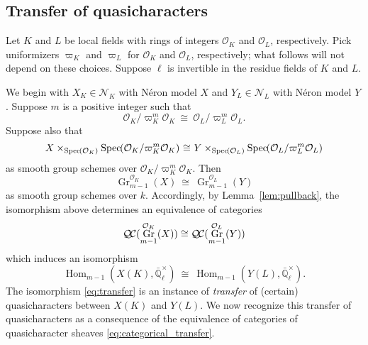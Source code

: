 \documentclass[10pt]{amsart}
\theoremstyle{plain}
\theoremstyle{definition}
\theoremstyle{remark}
\newcommand{\EE}{\mathbb{\bar Q}_\ell}
\newcommand{\OK}{\mathcal{O}_K}
\newcommand{\OL}{\mathcal{O}_L}
\newcommand{\Fq}{k}
\newcommand{\EEx}{\EE^\times}
\DeclareMathOperator{\Hom}{Hom}
\DeclareMathOperator{\Gr}{Gr}
\newcommand{\Spec}[1]{{\operatorname{Spec}\hskip-1pt( #1 )}}
\newcommand{\iso}{{\ \cong\ }}
\newcommand{\QC}{{\mathcal{Q\hskip-0.8pt C}}}
\begin{document}
\subsection{Transfer of quasicharacters}\label{ssec:transfer}

Let $K$ and $L$ be local fields with rings of integers $\OK$ and $\OL$, respectively. 
Pick uniformizers $\varpi_K$ and $\varpi_L$ for $\OK$ and $\OL$, respectively;
what follows will not depend on these choices.
Suppose $\ell$ is invertible in the residue fields of $K$ and $L$.

We begin with $X_K\in \mathcal{N}_K$ with N\'eron model $X$ and $Y_{L}\in \mathcal{N}_L$ with N\'eron model $Y$.
Suppose $m$ is a positive integer such that 
\[
\OK/\varpi_K^{m}\OK \iso \OL/\varpi_L^{m}\OL.
\]
Suppose also that
\begin{equation}\label{eq:schematic_transfer}
X \times_{\Spec{\OK}} \Spec{\OK/\varpi_K^{m}\OK} \iso Y \times_{\Spec{\OL}} \Spec{\OL/\varpi_L^{m}\OL}
\end{equation}
as smooth group schemes over $\OK/\varpi_K^{m}\OK$. 
Then
\[
\Gr^{\OK}_{m-1}(X) \iso \Gr^{\OL}_{m-1}(Y)
\]
as smooth group schemes over $\Fq$.  Accordingly, by Lemma~\ref{lem:pullback}, the isomorphism above determines an equivalence of categories
\begin{equation}\label{eq:categorical_transfer}
\QC(\Gr^{\OK}_{m-1}(X)) \cong \QC(\Gr^{\OL}_{m-1}(Y))
\end{equation}
which induces an isomorphism
\begin{equation}\label{eq:transfer}
\Hom_{m-1}(X(K),\EEx)  \iso  \Hom_{m-1}(Y(L),\EEx).
\end{equation}
The isomorphism \eqref{eq:transfer} is an instance of {\it transfer} of (certain) quasicharacters between $X(K)$ and $Y(L)$. 
We now recognize this transfer of quasicharacters as a consequence of the equivalence of categories of quasicharacter sheaves \eqref{eq:categorical_transfer}.
\end{document}

